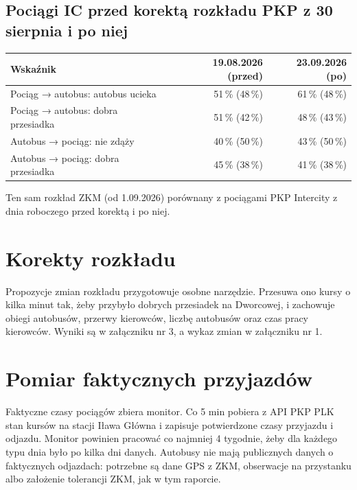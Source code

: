 \documentclass[10pt,a4paper]{article}
\newcommand{\mut}[1]{\textcolor{muted}{#1}}
\begin{document}
\subsection*{Pociągi IC przed korektą rozkładu PKP z 30 sierpnia i po niej}
{\small
\begin{center}\begin{tabular}{@{}l r r@{}}\toprule
Wskaźnik & 19.08.2026 (przed) & 23.09.2026 (po) \\ \midrule
Pociąg → autobus: autobus ucieka & 51\,\% \mut{(48\,\%)} & 61\,\% \mut{(48\,\%)} \\
Pociąg → autobus: dobra przesiadka & 51\,\% \mut{(42\,\%)} & 48\,\% \mut{(43\,\%)} \\
Autobus → pociąg: nie zdąży & 40\,\% \mut{(50\,\%)} & 43\,\% \mut{(50\,\%)} \\
Autobus → pociąg: dobra przesiadka & 45\,\% \mut{(38\,\%)} & 41\,\% \mut{(38\,\%)} \\
\bottomrule\end{tabular}\end{center}}
\mut{\footnotesize Ten sam rozkład ZKM (od 1.09.2026) porównany z pociągami PKP Intercity z dnia roboczego przed korektą i po niej.}
\section{Korekty rozkładu}
Propozycje zmian rozkładu przygotowuje osobne narzędzie. Przesuwa ono kursy o kilka minut tak, żeby przybyło dobrych przesiadek na Dworcowej, i zachowuje obiegi autobusów, przerwy kierowców, liczbę autobusów oraz czas pracy kierowców. Wyniki są w załączniku nr 3, a wykaz zmian w załączniku nr 1.
\section{Pomiar faktycznych przyjazdów}
Faktyczne czasy pociągów zbiera monitor. Co 5 min pobiera z API PKP PLK stan kursów na stacji Iława Główna i zapisuje potwierdzone czasy przyjazdu i odjazdu. Monitor powinien pracować co najmniej 4 tygodnie, żeby dla każdego typu dnia było po kilka dni danych. Autobusy nie mają publicznych danych o faktycznych odjazdach: potrzebne są dane GPS z ZKM, obserwacje na przystanku albo założenie tolerancji ZKM, jak w tym raporcie.
\end{document}
